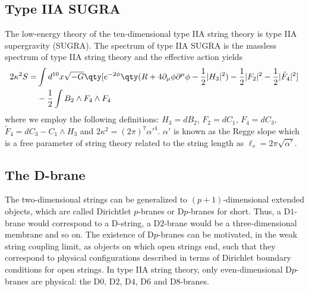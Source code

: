 \subsection{Type IIA SUGRA}
 
The low-energy theory of the ten-dimensional type IIA string theory is type IIA supergravity (SUGRA).
The spectrum of type IIA SUGRA is the massless spectrum of type IIA string theory and the effective action yields
\begin{align}
2\kappa^2 S=&\int d^{10}x \sqrt{-G}\qty[e^{-2\phi}\qty(R+4\partial_\mu\phi \partial^\mu\phi-\frac{1}{2}|H_3|^2)-\frac{1}{2}|F_2|^2-\frac{1}{2}|\tilde F_4|^2]\\& -\frac{1}{2}\int B_2\wedge F_4\wedge F_4
\end{align}
where we employ the following definitions:
$H_3=dB_2$, $F_2=dC_1$, $F_4=dC_3$, $\tilde F_4=dC_3 -C_1\wedge H_3$ and $2\kappa^2 =(2\pi)^7 \alpha'^4$.
$\alpha'$ is known as the Regge slope which is a free parameter of string theory related to the string length as $\ell_s = 2 \pi \sqrt{\alpha'}$.

\subsection{The D-brane}

The two-dimensional strings can be generalized to $(p+1)$-dimensional extended objects, which are 
called Dirichtlet $p$-branes or D$p$-branes for short.
Thus, a D$1$-brane would correspond to a D-string, a D$2$-brane would be a three-dimensional membrane and so on.
The existence of D$p$-branes can be motivated, in the weak string coupling limit, as 
objects on which open strings end,
such that they correspond to physical configurations described in terms of Dirichlet boundary conditions for open strings.
In type IIA string theory, only even-dimensional D$p$-branes are physical: the D$0$, D$2$, D$4$, D$6$ and D$8$-branes.

